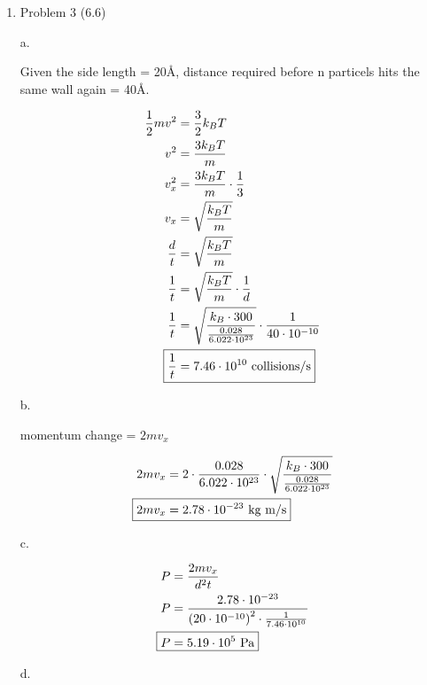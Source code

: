 \documentclass[12pt]{article}
\begin{document}
\begin{enumerate}
    c.

    \begin{align*}
        550 &= \sqrt{\frac{8k_B\cdot T}{\pi \cdot 2.43\cdot10^{-25}}} \\
        \Aboxed{T &= 2086 \text{ K}}
    \end{align*}
    
    \newpage
    \item Problem 3 (6.6)
    
    a.

    Given the side length = 20\AA, distance required before n particels hits the same wall again = 40\AA.

    \begin{align*}
        \frac{1}{2} mv^2 &= \frac{3}{2} k_BT \\
        v^2 &= \frac{3k_BT}{m} \\
        v_x^2 &= \frac{3k_BT}{m} \cdot \frac{1}{3} \\
        v_x &= \sqrt{\frac{k_BT}{m}} \\
        \frac{d}{t} &= \sqrt{\frac{k_BT}{m}} \\
        \frac{1}{t} &= \sqrt{\frac{k_BT}{m}} \cdot \frac{1}{d} \\
        \frac{1}{t} &= \sqrt{\frac{k_B \cdot 300}{\frac{0.028}{6.022\cdot10^{23}}}} \cdot \frac{1}{40\cdot10^{-10}} \\
        \Aboxed{\frac{1}{t} &= 7.46\cdot10^{10} \text{ collisions/s}}
    \end{align*}

    b.

    momentum change = $2mv_x$

    \begin{align*}
        2mv_x &= 2\cdot\frac{0.028}{6.022\cdot10^{23}} \cdot \sqrt{\frac{k_B \cdot 300}{\frac{0.028}{6.022\cdot10^{23}}}} \\
        \Aboxed{2mv_x &= 2.78\cdot10^{-23} \text{ kg m/s}}
    \end{align*}

    c.

    \begin{align*}
        P &= \frac{2mv_x}{d^2 t} \\
        P &= \frac{2.78\cdot10^{-23}}{\left(20\cdot10^{-10}\right)^2 \cdot \frac{1}{7.46\cdot10^{10}}} \\
        \Aboxed{P &= 5.19\cdot10^5 \text{ Pa}}
    \end{align*}

    d.


\end{enumerate}
\end{document}
